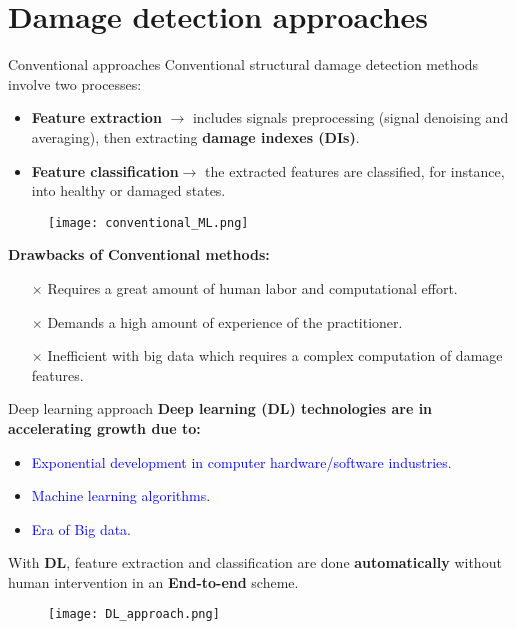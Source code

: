 \documentclass[10pt,aspectratio=169,dvipsnames]{beamer} %
\begin{document}
	\section{Damage detection approaches}
	\begin{frame}{Conventional approaches}
		Conventional structural damage detection methods involve two processes:
		\begin{itemize}
			\item \alert{\textbf{Feature extraction}} \(\rightarrow\) includes signals preprocessing (signal denoising and averaging), then extracting \textbf{damage indexes (DIs)}.
			\item \alert{\textbf{Feature classification}}\(\rightarrow\) the extracted features are classified, for instance, into healthy or damaged states.
		\end{itemize}
		\begin{figure}
			\centering
			\texttt{[image: conventional\_ML.png]}
		\end{figure}	
		\textbf{Drawbacks of Conventional methods:}
		\begin{itemize}
			\item[$\times$]\alert{Requires a great amount of human labor and computational effort.}
			\item[$\times$]\alert{Demands a high amount of experience of the practitioner.}
			\item[$\times$]\alert{Inefficient with big data which requires a complex computation of damage features.} 
		\end{itemize}
	\end{frame}
	
	\begin{frame}{Deep learning approach}
		\textbf{Deep learning (DL) technologies are in accelerating growth due to:}
		\begin{itemize}
			\item \textcolor{blue}{Exponential development in computer hardware/software industries.}
			\item \textcolor{blue}{Machine learning algorithms.}
			\item \textcolor{blue}{Era of Big data.}
		\end{itemize}	
		With \textbf{DL}, feature extraction and classification are done \alert{\textbf{automatically}} without human intervention in an \alert{\textbf{End-to-end}} scheme.
		\begin{figure}
			\texttt{[image: DL\_approach.png]}
		\end{figure}
	\end{frame}
\end{document}
